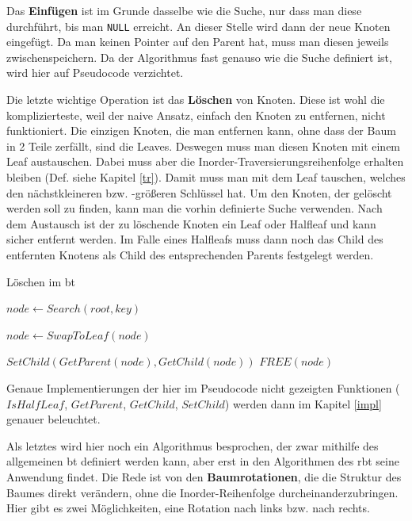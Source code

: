 \documentclass[11pt]{article}
\newcommand{\lstin}[1]{\lstinline[language=C]{#1}}
\begin{document}
Das \textbf{Einfügen} ist im Grunde dasselbe wie die Suche, nur dass man diese durchführt, bis man \lstin{NULL} erreicht. 
An dieser Stelle wird dann der neue Knoten eingefügt. Da man keinen Pointer auf den Parent hat, muss man diesen jeweils zwischenspeichern.
\cite[S. 205]{aic}
Da der Algorithmus fast genauso wie die Suche definiert ist, wird hier auf Pseudocode verzichtet. 

Die letzte wichtige Operation ist das \textbf{Löschen} von Knoten. Diese ist wohl die komplizierteste, weil der naive Ansatz, einfach den Knoten zu entfernen, nicht funktioniert.
Die einzigen Knoten, die man entfernen kann, ohne dass der Baum in 2 Teile zerfällt, sind die Leaves.
Deswegen muss man diesen Knoten mit einem Leaf austauschen. Dabei muss aber die Inorder-Traversierungsreihenfolge erhalten bleiben (Def. siehe Kapitel \ref{tr}).
Damit muss man mit dem Leaf tauschen, welches den nächstkleineren bzw. -größeren Schlüssel hat.
Um den Knoten, der gelöscht werden soll zu finden, kann man die vorhin definierte Suche verwenden.
Nach dem Austausch ist der zu löschende Knoten ein Leaf oder Halfleaf und kann sicher entfernt werden. 
Im Falle eines Halfleafs muss dann noch das Child des entfernten Knotens als Child des entsprechenden Parents festgelegt werden.

\begin{algorithm}
  \caption{Löschen im \gls{bt}}
  \begin{algorithmic}[1]
    \State $node \gets Search(root, key)$

      
      \Return
    \EndIf

    \State $node \gets SwapToLeaf(node)$

      \State $SetChild(GetParent(node), GetChild(node))$
    \EndIf
    \State $FREE(node)$  
    \EndProcedure
  \end{algorithmic}
\end{algorithm}
\cite[S. 210f]{aic}

Genaue Implementierungen der hier im Pseudocode nicht gezeigten Funktionen ($IsHalfLeaf$, $GetParent$, $GetChild$, $SetChild$) werden dann im Kapitel \ref{impl} genauer beleuchtet.

Als letztes wird hier noch ein Algorithmus besprochen, der zwar mithilfe des allgemeinen \gls{bt} definiert werden kann, aber erst in den Algorithmen des \gls{rbt} seine Anwendung findet. 
Die Rede ist von den \textbf{Baumrotationen}, die die Struktur des Baumes direkt verändern, ohne die Inorder-Reihenfolge durcheinanderzubringen.
Hier gibt es zwei Möglichkeiten, eine Rotation nach links bzw. nach rechts.
\end{document}

